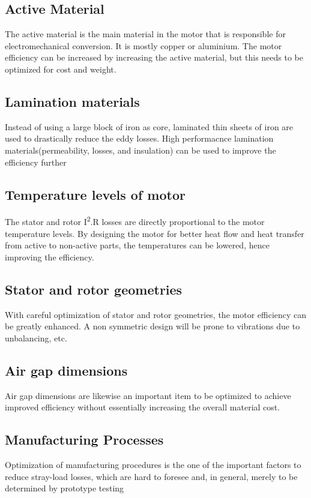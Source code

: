 \subsection{Active Material}
The active material is the main material in the motor that is responsible for electromechanical conversion. It is mostly copper or aluminium. The motor efficiency can be increased by increasing the active material, but this needs to be optimized for cost and weight.

\subsection{Lamination materials}
Instead of using a large block of iron as core, laminated thin sheets of iron are used to drastically reduce the eddy losses. High performacnce lamination materials(permeability, losses, and insulation)  can be used  to improve the efficiency further 

\subsection{Temperature levels of motor}
The stator and rotor I\textsuperscript{2}.R losses are directly proportional to the motor temperature levels. By designing the motor for better heat flow and heat transfer from active to non-active parts, the temperatures can be lowered, hence improving the efficiency.

\subsection{Stator and rotor geometries}
With careful optimization of stator and rotor geometries, the motor efficiency can be greatly enhanced. A non symmetric design will be prone to vibrations due to unbalancing, etc.

\subsection{Air gap dimensions}
Air gap dimensions are likewise an important item to be optimized to achieve improved efficiency without essentially increasing the overall material cost.

\subsection{Manufacturing Processes}
Optimization of manufacturing procedures is the one of the important factors to reduce stray-load losses, which are hard to foresee and, in general, merely to be determined by 
prototype testing

